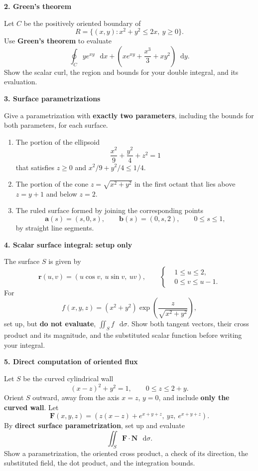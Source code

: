 \documentclass[11pt,letterpaper]{article}
\renewcommand{\vec}[1]{\mathbf{#1}}
\newcommand{\dd}{\mathop{}\!\mathrm{d}}
\newcommand{\examproblem}[3]{%
  \par\medskip\Needspace{5\baselineskip}
  \noindent\textbf{#1. #2}\par\nobreak
}
\begin{document}
\examproblem{2}{Green's theorem}{12}
Let $C$ be the positively oriented boundary of
\[
R=\{(x,y):x^2+y^2\leq2x,\ y\geq0\}.
\]
Use \textbf{Green's theorem} to evaluate
\[
\oint_C ye^{xy}\,\dd x+
\left(xe^{xy}+\frac{x^3}{3}+xy^2\right)\dd y.
\]
Show the scalar curl, the region and bounds for your double integral,
and its evaluation.

\examproblem{3}{Surface parametrizations}{12}
Give a parametrization with \textbf{exactly two parameters}, including
the bounds for both parameters, for each surface.

\begin{enumerate}[label=(\alph*)]
\item The portion of the ellipsoid
\[
\frac{x^2}{9}+\frac{y^2}{4}+z^2=1
\]
that satisfies $z\geq0$ and $x^2/9+y^2/4\leq1/4$.

\item The portion of the cone $z=\sqrt{x^2+y^2}$ in the first octant
that lies above $z=y+1$ and below $z=2$.

\item The ruled surface formed by joining the corresponding points
\[
\vec a(s)=(s,0,s),\qquad \vec b(s)=(0,s,2),\qquad0\leq s\leq1,
\]
by straight line segments.

\end{enumerate}

\examproblem{4}{Scalar surface integral: setup only}{12}
The surface $S$ is given by
\[
\vec r(u,v)=(u\cos v,\ u\sin v,\ uv),\qquad
\left\{\begin{aligned}
&1\leq u\leq2,\\
&0\leq v\leq u-1.
\end{aligned}\right.
\]
For
\[
f(x,y,z)=(x^2+y^2)
\exp\!\left(\frac{z}{\sqrt{x^2+y^2}}\right),
\]
set up, but \textbf{do not evaluate}, $\displaystyle\iint_S f\,\dd\sigma$.
Show both tangent vectors, their cross product and its magnitude, and
the substituted scalar function before writing your integral.

\examproblem{5}{Direct computation of oriented flux}{20}
Let $S$ be the curved cylindrical wall
\[
(x-z)^2+y^2=1,\qquad0\leq z\leq2+y.
\]
Orient $S$ outward, away from the axis $x=z$, $y=0$, and include
\textbf{only the curved wall}. Let
\[
\vec F(x,y,z)=
\left(z(x-z)+e^{x+y+z},\ yz,\ e^{x+y+z}\right).
\]
By \textbf{direct surface parametrization}, set up and evaluate
\[
\iint_S\vec F\cdot\vec N\,\dd\sigma.
\]
Show a parametrization, the oriented cross product, a check of its
direction, the substituted field, the dot product, and the integration bounds.
\end{document}
